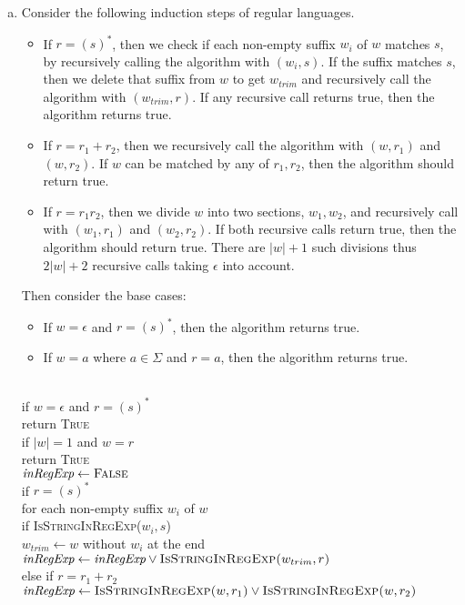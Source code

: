 \documentclass[11pt]{article}
\begin{document}
\begin{solution}
\begin{enumerate}[(a)]
\item Consider the following induction steps of regular languages.
\begin{itemize}
\item If $r=(s)^*$, then we check if each non-empty suffix $w_i$ of $w$ matches $s$, by recursively calling the algorithm with $(w_i, s)$. If the suffix matches $s$, then we delete that suffix from $w$ to get $w_{trim}$ and recursively call the algorithm with $(w_{trim}, r)$. If any recursive call returns true, then the algorithm returns true.
\item If $r=r_1+r_2$, then we recursively call the algorithm with $(w, r_1)$ and $(w, r_2)$. If $w$ can be matched by any of $r_1, r_2$, then the algorithm should return true.
\item If $r=r_1r_2$, then we divide $w$ into two sections, $w_1, w_2$, and recursively call with $(w_1, r_1)$ and $(w_2, r_2)$. If both recursive calls return true, then the algorithm should return true. There are $|w|+1$ such divisions thus $2|w|+2$ recursive calls taking $\epsilon$ into account.
\end{itemize}
Then consider the base cases:
\begin{itemize}
\item If $w=\epsilon$ and $r=(s)^*$, then the algorithm returns true.
\item If $w=a$ where $a\in \Sigma$ and $r=a$, then the algorithm returns true.
\end{itemize}
\begin{algo}
	\textsc{}\+
\\	if $w=\epsilon$ and $r=(s)^*$\+
\\	return \textsc{True}\-
\\	if $|w|=1$ and $w=r$\+
\\	return \textsc{True}\-
\\	$\emph{inRegExp}\gets \textsc{False}$
\\	if $r=(s)^*$\+
\\	for each non-empty suffix $w_i$ of $w$\+
\\	if \textsc{IsStringInRegExp($w_i, s$)}\+
\\	$w_{trim}\gets w$ without $w_i$ at the end
\\	$\emph{inRegExp}\gets \emph{inRegExp} \lor \textsc{IsStringInRegExp($w_{trim}, r$)}$\-\-\-
\\	else if $r=r_1+r_2$\+
\\	$\emph{inRegExp}\gets \textsc{IsStringInRegExp($w, r_1$)} \lor \textsc{IsStringInRegExp($w, r_2$)}$\-

\end{algo}
\end{enumerate}
\end{solution}
\end{document}
